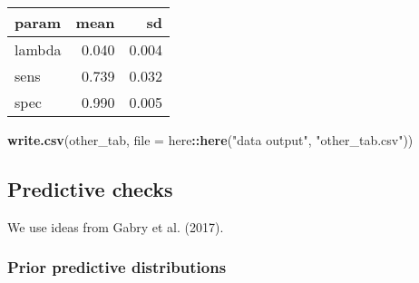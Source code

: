 \documentclass[]{article}
\newenvironment{Shaded}{\begin{snugshade}}{\end{snugshade}}
\newcommand{\DataTypeTok}[1]{\textcolor[rgb]{0.13,0.29,0.53}{#1}}
\newcommand{\DecValTok}[1]{\textcolor[rgb]{0.00,0.00,0.81}{#1}}
\newcommand{\KeywordTok}[1]{\textcolor[rgb]{0.13,0.29,0.53}{\textbf{#1}}}
\newcommand{\NormalTok}[1]{#1}
\newcommand{\OperatorTok}[1]{\textcolor[rgb]{0.81,0.36,0.00}{\textbf{#1}}}
\newcommand{\OtherTok}[1]{\textcolor[rgb]{0.56,0.35,0.01}{#1}}
\newcommand{\StringTok}[1]{\textcolor[rgb]{0.31,0.60,0.02}{#1}}
\begin{document}
\begin{Shaded}
\end{Shaded}

\begin{longtable}[]{@{}lrr@{}}
\toprule
param & mean & sd\tabularnewline
\midrule
\endhead
lambda & 0.040 & 0.004\tabularnewline
sens & 0.739 & 0.032\tabularnewline
spec & 0.990 & 0.005\tabularnewline
\bottomrule
\end{longtable}

\begin{Shaded}
\begin{Highlighting}[]
\KeywordTok{write.csv}\NormalTok{(other_tab, }\DataTypeTok{file =}\NormalTok{ here}\OperatorTok{::}\KeywordTok{here}\NormalTok{(}\StringTok{"data output"}\NormalTok{, }\StringTok{"other_tab.csv"}\NormalTok{))}
\end{Highlighting}
\end{Shaded}

\hypertarget{predictive-checks}{%
\subsection{Predictive checks}\label{predictive-checks}}

We use ideas from Gabry et al. (2017).

\hypertarget{prior-predictive-distributions}{%
\subsubsection{Prior predictive
distributions}\label{prior-predictive-distributions}}
\end{document}
